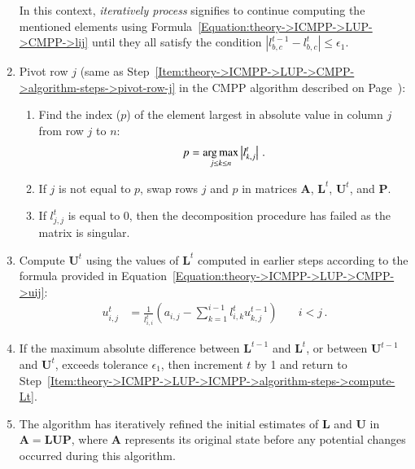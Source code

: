 \begin{enumerate}
		In this context, \textit{iteratively process} signifies to continue computing the mentioned elements using Formula~\ref{Equation:theory->ICMPP->LUP->CMPP->lij} until they all satisfy the condition $\left|l^{t-1}_{b, c} - l^{t}_{b, c}\right| \leq \epsilon_1$.
	\item \label{Item:theory->ICMPP->LUP->ICMPP->algorithm-steps->pivot-row}
		Pivot row $j$ (same as Step~\ref{Item:theory->ICMPP->LUP->CMPP->algorithm-steps->pivot-row-j} in the CMPP algorithm described on Page~\pageref{Item:theory->ICMPP->LUP->CMPP->algorithm-steps->pivot-row-j}):
		\begin{enumerate}
			\item \label{Item:theory->ICMPP->LUP->ICMPP->algorithm-steps->pivot-row->argmax}
				Find the index ($p$) of the element largest in absolute value in column $j$ from row $j$ to $n$:
				\begin{equation}
					p = \operatorname*{arg\,max}_{j \leq k \leq n} \left| l^{t}_{k, j} \right| \nonumber\,.
				\end{equation}
			\item \label{Item:theory->ICMPP->LUP->ICMPP->algorithm-steps->pivot-row->swap-rows}
				If $j$ is not equal to $p$, swap rows $j$ and $p$ in matrices $\mathbf{A}$, $\mathbf{L}^{t}$, $\mathbf{U}^{t}$, and $\mathbf{P}$.
			\item \label{Item:theory->ICMPP->LUP->ICMPP->algorithm-steps->pivot-row->singular-matrix-check}
				If $l^{t}_{j,j}$ is equal to 0, then the decomposition procedure has failed as the matrix is singular.
		\end{enumerate}
	\item \label{Item:theory->ICMPP->LUP->ICMPP->algorithm-steps->compute-Ut}
		Compute $\mathbf{U}^{t}$ using the values of $\mathbf{L}^{t}$ computed in earlier steps according to the formula provided in Equation~\ref{Equation:theory->ICMPP->LUP->CMPP->uij}:
		\begin{align}
			u_{i,j}^{t} &= \frac{1}{l_{i,i}^{t}} \left ( a_{i,j} - \sum_{k=1}^{i-1}l_{i,k}^{t}u_{k,j}^{t-1} \right ) &\quad i < j \nonumber\,.
		\end{align}
	\item \label{Item:theory->ICMPP->LUP->ICMPP->algorithm-steps->evaluate-processing-rule}
		If the maximum absolute difference between $\mathbf{L}^{t-1}$ and $\mathbf{L}^{t}$, or between $\mathbf{U}^{t-1}$ and $\mathbf{U}^{t}$, exceeds tolerance $\epsilon_1$, then increment $t$ by 1 and return to Step~\ref{Item:theory->ICMPP->LUP->ICMPP->algorithm-steps->compute-Lt}.
	\item The algorithm has iteratively refined the initial estimates of $\mathbf{L}$ and $\mathbf{U}$ in $\mathbf{A} = \mathbf{LUP}$, where $\mathbf{A}$ represents its original state before any potential changes occurred during this algorithm.
\end{enumerate}


